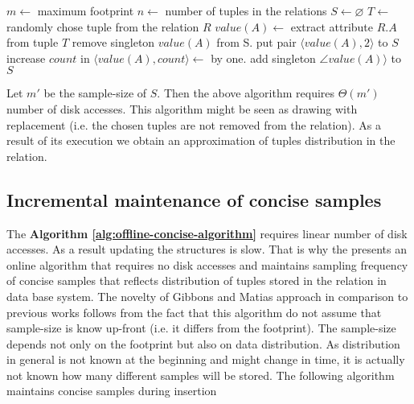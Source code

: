 \begin{center}
    \label{alg:offline-concise-algorithm}
\begin{algorithmic}
  \State $m \gets$ maximum footprint
  \State $n \gets$ number of tuples in the relations
  \State $S \gets  \varnothing$
    \State $T \gets$ randomly chose tuple from the relation $R$
    \State $value(A) \gets$ extract attribute $R.A$ from tuple $T$
        \State remove singleton $value(A)$ from S.
        \State put pair $\langle value(A), 2 \rangle$ to $S$
        \State increase $count$ in $\langle value(A), count
        \rangle \gets$ by one.
    \Else
        \State add singleton $\angle value(A) \rangle$ to $S$
    \EndIf
    \EndWhile
  \end{algorithmic}
\end{center}

Let $m'$ be the sample-size of $S$. Then the above algorithm requires
$\Theta(m')$ number of disk accesses. This algorithm might be seen
as drawing with replacement (i.e. the chosen tuples are
not removed from the relation). As a result of its execution we obtain
an approximation of tuples distribution in the relation.

\subsection{Incremental maintenance of concise samples}
The \textbf{Algorithm \ref{alg:offline-concise-algorithm}} requires
linear number of disk
accesses. As a result updating the structures is slow. That is why
the \cite{GM98} presents an online algorithm that requires no disk
accesses and maintains sampling frequency of concise samples that
reflects distribution of tuples stored in the relation in data base system.
The novelty of Gibbons and Matias approach in comparison to previous
works follows from the fact that this algorithm do not assume that
sample-size is know up-front (i.e. it differs from the footprint).
The sample-size depends not only on the footprint but also on data
distribution. As distribution in general is not known at the beginning
and might change in time, it is actually not known how many different
samples will be stored. The following algorithm maintains concise
samples during insertion

